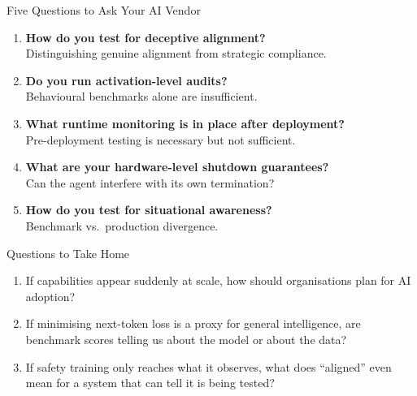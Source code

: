 \documentclass[aspectratio=169, 12pt, xcolor={dvipsnames,table}]{beamer}
\begin{document}
\begin{frame}{Five Questions to Ask Your AI Vendor}
  \begin{enumerate}\setlength{\itemsep}{0.45em}
    \item {\small \textbf{How do you test for \alert{deceptive alignment}?}\\
          {\footnotesize Distinguishing genuine alignment from
          strategic compliance.}}
    \item {\small \textbf{Do you run \alert{activation-level audits}?}\\
          {\footnotesize Behavioural benchmarks alone are insufficient.}}
    \item {\small \textbf{What \alert{runtime monitoring} is in place
          after deployment?}\\
          {\footnotesize Pre-deployment testing is necessary but not
          sufficient.}}
    \item {\small \textbf{What are your \alert{hardware-level shutdown
          guarantees}?}\\
          {\footnotesize Can the agent interfere with its own
          termination?}}
    \item {\small \textbf{How do you test for \alert{situational
          awareness}?}\\
          {\footnotesize Benchmark vs.\ production divergence.}}
  \end{enumerate}
\end{frame}


\begin{frame}{Questions to Take Home}
  \begin{enumerate}\setlength{\itemsep}{0.6em}
    \item {\small If capabilities appear suddenly at scale,
          \alert{how should organisations plan for AI adoption}?}
    \item {\small If minimising next-token loss is a proxy for general
          intelligence, \alert{are benchmark scores telling us about
          the model or about the data}?}
    \item {\small If safety training only reaches what it observes,
          \alert{what does ``aligned'' even mean} for a system that
          can tell it is being tested?}
  \end{enumerate}
\end{frame}
\end{document}
